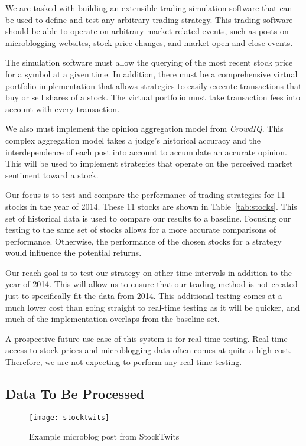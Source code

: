 We are tasked with building an extensible trading simulation software that can be used to define and test any arbitrary trading strategy.
This trading software should be able to operate on arbitrary market-related events, such as posts on microblogging websites, stock price changes, and market open and close events.

The simulation software must allow the querying of the most recent stock price for a symbol at a given time.
In addition, there must be a comprehensive virtual portfolio implementation that allows strategies to easily execute transactions that buy or sell shares of a stock.
The virtual portfolio must take transaction fees into account with every transaction.

We also must implement the opinion aggregation model from \textit{CrowdIQ}.
This complex aggregation model takes a judge's historical accuracy and the interdependence of each post into account to accumulate an accurate opinion.
This will be used to implement strategies that operate on the perceived market sentiment toward a stock.

Our focus is to test and compare the performance of trading strategies for 11 stocks in the year of 2014.
These 11 stocks are shown in Table~\ref{tab:stocks}.
This set of historical data is used to compare our results to a baseline.
Focusing our testing to the same set of stocks allows for a more accurate comparisons of performance.
Otherwise, the performance of the chosen stocks for a strategy would influence the potential returns.

Our reach goal is to test our strategy on other time intervals in addition to the year of 2014.
This will allow us to ensure that our trading method is not created just to specifically fit the data from 2014.
This additional testing comes at a much lower cost than going straight to real-time testing as it will be quicker, and much of the implementation overlaps from the baseline set. 

A prospective future use case of this system is for real-time testing.
Real-time access to stock prices and microblogging data often comes at quite a high cost.
Therefore, we are not expecting to perform any real-time testing.

\subsection{Data To Be Processed}

\begin{figure}
  \centering
  \texttt{[image: stocktwits]}
  \caption{Example microblog post from StockTwits}\label{fig:stocktwits}
\end{figure}

